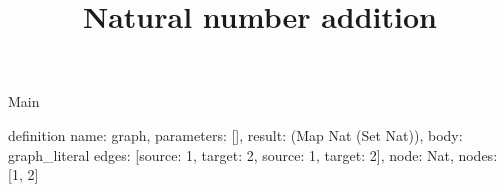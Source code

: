 \begin{lexlean}{Main}
\title{Natural number addition}
\begin{semanticmodule}
definition{
  name: graph,
  parameters: [],
  result: (Map Nat (Set Nat)),
  body: graph_literal{
    edges: [{source: 1, target: 2}, {source: 1, target: 2}],
    node: Nat,
    nodes: [1, 2]
  }
}
\end{semanticmodule}
\end{lexlean}
